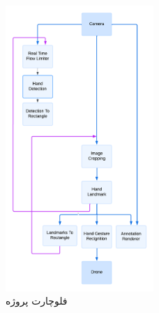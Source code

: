\begin{figure}[h]
    \centering
    \includegraphics[width=0.5\textwidth]{flowchart.png}
    \caption{فلوچارت پروژه}
\end{figure}







